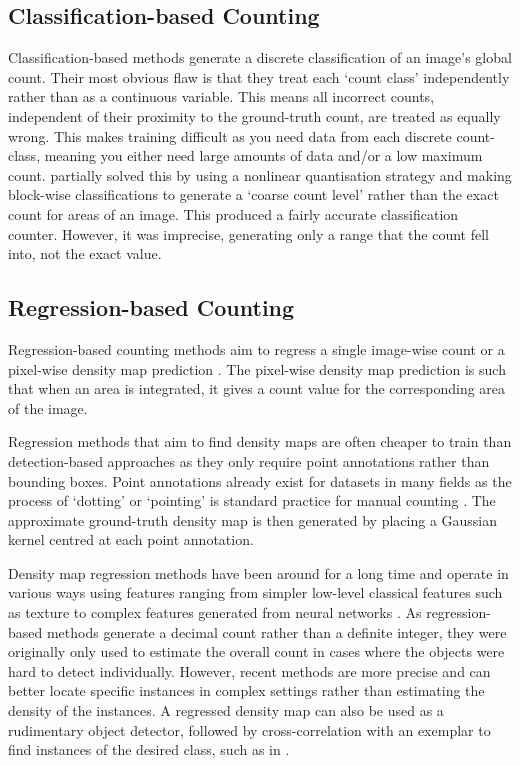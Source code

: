 \documentclass[../thesis.tex]{subfiles}
\begin{document}
\subsection{Classification-based Counting}
Classification-based methods \cite{mundhenk2016large, Aggarwal2001} generate a discrete classification of an image's global count. 
Their most obvious flaw is that they treat each `count class' independently rather than as a continuous variable. 
This means all incorrect counts, independent of their proximity to the ground-truth count, are treated as equally wrong. 
This makes training difficult as you need data from each discrete count-class, meaning you either need large amounts of data and/or a low maximum count.
\citet{8846229} partially solved this by using a nonlinear quantisation strategy and making block-wise classifications to generate a `coarse count level' rather than the exact count for areas of an image. This produced a fairly accurate classification counter. However, it was imprecise, generating only a range that the count fell into, not the exact value.

\subsection{Regression-based Counting} 
Regression-based counting methods aim to regress a single image-wise count \cite{chan2009bayesian, wang2011automatic, wang2015deep} or a pixel-wise density map prediction \cite{lempitsky2010learning, cao2018scale, ranjan2021Famnet, xie2018microscopy}.
The pixel-wise density map prediction is such that when an area is integrated, it gives a count value for the corresponding area of the image.

Regression methods that aim to find density maps are often cheaper to train than detection-based approaches as they only require point annotations rather than bounding boxes. 
Point annotations already exist for datasets in many fields as the process of `dotting' or `pointing' is standard practice for manual counting \cite{8578940, zhang2016single, sindagi2020jhu, cohen2017countception, 10.1007/978-3-319-24574-4_33, Gao_2021}.
The approximate ground-truth density map is then generated by placing a Gaussian kernel centred at each point annotation.

Density map regression methods have been around for a long time \cite{marana1997estimation} and operate in various ways using features ranging from simpler low-level classical features \cite{chan2009bayesian} such as texture \cite{marana1997estimation, 757602, marana1998automatic} to complex features generated from neural networks  \cite{zhang2015cross,zhang2016single}. 
As regression-based methods generate a decimal count rather than a definite integer, they were originally only used to estimate the overall count in cases where the objects were hard to detect individually. However, recent methods are more precise and can better locate specific instances in complex settings rather than estimating the density of the instances.
A regressed density map can also be used as a rudimentary object detector, followed by cross-correlation with an exemplar to find instances of the desired class, such as in \citet{sokhandan2020few}.
\end{document}
